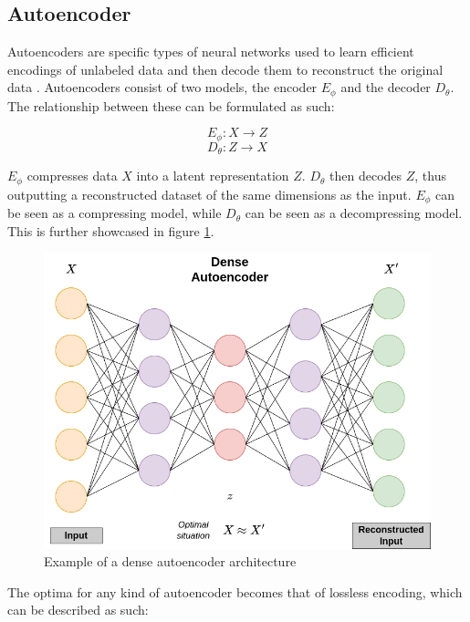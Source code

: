 \subsection{Autoencoder}

Autoencoders are specific types of neural networks used to learn efficient encodings of unlabeled data and then decode them to reconstruct the original data \cite{bank2021autoencoders}. Autoencoders consist of two models, the encoder $E_\phi$ and the decoder $D_\theta$. The relationship between these can be formulated as such: 

\begin{equation}\label{eq:enc}
E_\phi: X \rightarrow Z 
\end{equation}
\begin{equation}\label{eq:dec}
D_\theta: Z \rightarrow X
\end{equation}

$E_\phi$ compresses data $X$ into a latent representation $Z$. $D_\theta$ then decodes $Z$, thus outputting a reconstructed dataset of the same dimensions as the input. $E_\phi$ can be seen as a compressing model, while $D_\theta$ can be seen as a decompressing model. This is further showcased in figure \ref{fig:aediagram}. 

\begin{figure}[!h]
    \centering
    \includegraphics[scale=0.4]{figures/ae.png}
    \caption{Example of a dense autoencoder architecture}
    \label{fig:aediagram}
\end{figure}

The optima for any kind of autoencoder becomes that of lossless encoding, which can be described as such:

